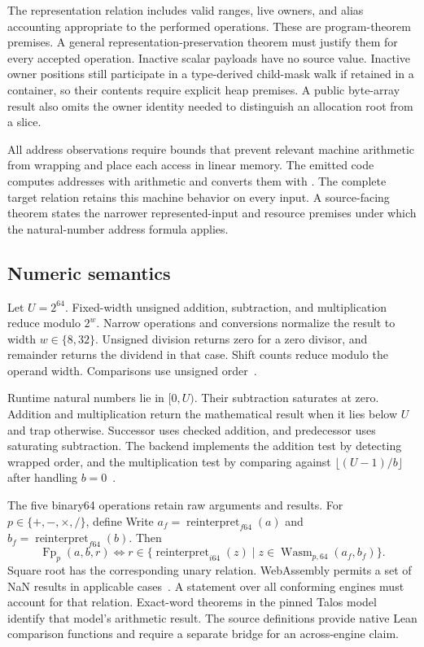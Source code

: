 \documentclass[11pt]{article}
\newcommand{\code}[1]{\texttt{\seqsplit{#1}}}
\begin{document}
The representation relation includes valid ranges, live owners, and alias accounting appropriate to the performed operations.  These are program-theorem premises.  A general representation-preservation theorem must justify them for every accepted operation.  Inactive scalar payloads have no source value.  Inactive owner positions still participate in a type-derived child-mask walk if retained in a container, so their contents require explicit heap premises.  A public byte-array result also omits the owner identity needed to distinguish an allocation root from a slice.

All address observations require bounds that prevent relevant machine arithmetic from wrapping and place each access in linear memory.  The emitted code computes addresses with \code{i64} arithmetic and converts them with \code{i32.wrap\_i64}.  The complete target relation retains this machine behavior on every input.  A source-facing theorem states the narrower represented-input and resource premises under which the natural-number address formula applies.

\subsection{Numeric semantics}

Let $U=2^{64}$.  Fixed-width unsigned addition, subtraction, and multiplication reduce modulo $2^w$.  Narrow operations and conversions normalize the result to width $w\in\{8,32\}$.  Unsigned division returns zero for a zero divisor, and remainder returns the dividend in that case.  Shift counts reduce modulo the operand width.  Comparisons use unsigned order~\cite{extract,binary}.

Runtime natural numbers lie in $[0,U)$.  Their subtraction saturates at zero.  Addition and multiplication return the mathematical result when it lies below $U$ and trap otherwise.  Successor uses checked addition, and predecessor uses saturating subtraction.  The backend implements the addition test by detecting wrapped order, and the multiplication test by comparing against $\lfloor(U-1)/b\rfloor$ after handling $b=0$~\cite{binary}.

The five binary64 operations retain raw \code{U64} arguments and results.  For $p\in\{+,-,\times,/\}$, define
Write $a_f=\operatorname{reinterpret}_{f64}(a)$ and $b_f=\operatorname{reinterpret}_{f64}(b)$.  Then
\[
\operatorname{Fp}_p(a,b,r)
\iff
r\in\{\operatorname{reinterpret}_{i64}(z)\mid
 z\in\operatorname{Wasm}_{p,64}(a_f,b_f)\}.
\]
Square root has the corresponding unary relation.  WebAssembly permits a set of NaN results in applicable cases~\cite{wasm}.  A statement over all conforming engines must account for that relation.  Exact-word theorems in the pinned Talos model identify that model's arithmetic result.  The source \code{LeanExe.Float64} definitions provide native Lean comparison functions and require a separate bridge for an across-engine claim.
\end{document}

